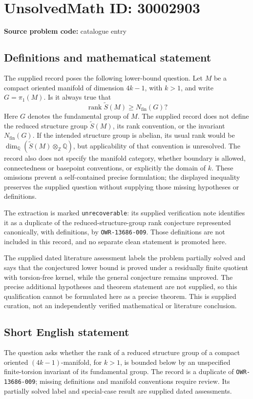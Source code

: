 \documentclass[11pt]{article}
\newcommand{\Z}{\mathbb{Z}}
\newcommand{\Q}{\mathbb{Q}}
\begin{document}
\section*{UnsolvedMath ID: 30002903}
\textbf{Source problem code:} catalogue entry
\subsection{Definitions and mathematical statement}
The supplied record poses the following lower-bound question. Let \(M\) be a compact oriented manifold of dimension \(4k-1\), with \(k>1\), and write \(G=\pi_1(M)\). Is it always true that
\[
\operatorname{rank}\widetilde S(M)\geq N_{\mathrm{fin}}(G)?
\]
Here \(G\) denotes the fundamental group of \(M\). The supplied record does not define the reduced structure group \(\widetilde S(M)\), its rank convention, or the invariant \(N_{\mathrm{fin}}(G)\). If the intended structure group is abelian, its usual rank would be \(\dim_{\Q}(\widetilde S(M)\otimes_{\Z}\Q)\), but applicability of that convention is unresolved. The record also does not specify the manifold category, whether boundary is allowed, connectedness or basepoint conventions, or explicitly the domain of \(k\). These omissions prevent a self-contained precise formulation; the displayed inequality preserves the supplied question without supplying those missing hypotheses or definitions.

The extraction is marked \texttt{unrecoverable}: its supplied verification note identifies it as a duplicate of the reduced-structure-group rank conjecture represented canonically, with definitions, by \texttt{OWR-13686-009}. Those definitions are not included in this record, and no separate clean statement is promoted here.

The supplied dated literature assessment labels the problem partially solved and says that the conjectured lower bound is proved under a residually finite quotient with torsion-free kernel, while the general conjecture remains unproved. The precise additional hypotheses and theorem statement are not supplied, so this qualification cannot be formulated here as a precise theorem. This is supplied curation, not an independently verified mathematical or literature conclusion.
\subsection{Short English statement}
The question asks whether the rank of a reduced structure group of a compact oriented \((4k-1)\)-manifold, for \(k>1\), is bounded below by an unspecified finite-torsion invariant of its fundamental group. The record is a duplicate of \texttt{OWR-13686-009}; missing definitions and manifold conventions require review. Its partially solved label and special-case result are supplied dated assessments.
\end{document}

